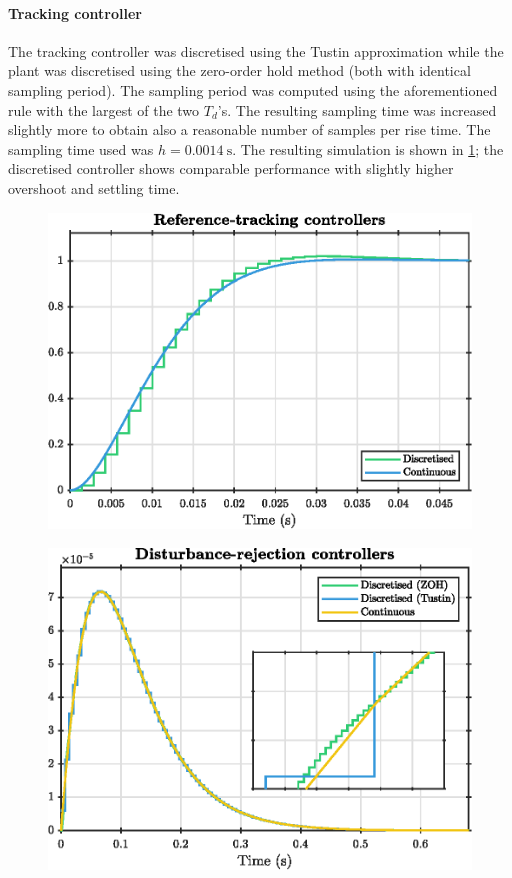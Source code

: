 \paragraph{Tracking controller}
The tracking controller was discretised using the Tustin approximation while the plant was discretised using the zero-order hold method (both with identical sampling period). The sampling period was computed using the aforementioned rule with the largest of the two $T_d$'s. The resulting sampling time was increased slightly more to obtain also a reasonable number of samples per rise time. The sampling time used was $h = \SI{0.0014}{\second}$. The resulting simulation is shown in \cref{fig:q4_dt_tracking}; the discretised controller shows comparable performance with slightly higher overshoot and settling time.
\begin{figure}[ht]
    \centering
    \includegraphics[]{media/q4/dt_tracking.eps}
    \caption{}
    \label{fig:q4_dt_tracking}
\end{figure}

\begin{figure}[ht]
    \centering
    \includegraphics[]{media/q4/dt_distrej.eps}
    \caption{}
    \label{fig:q4_dt_distrej}
\end{figure}
